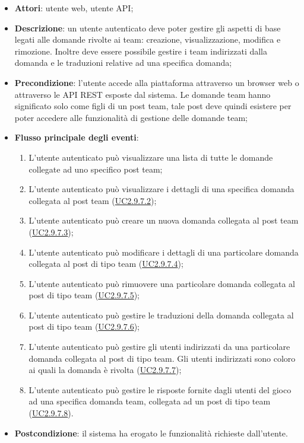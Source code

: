 \begin{itemize}
\item \textbf{Attori}: utente web, utente API;
\item \textbf{Descrizione}: un utente autenticato deve poter gestire gli aspetti di base legati alle domande rivolte ai team: creazione, visualizzazione, modifica e rimozione. Inoltre deve essere possibile gestire i team indirizzati dalla domanda e le traduzioni relative ad una specifica domanda; 
      \item \textbf{Precondizione}: l'utente accede alla piattaforma attraverso un browser web o attraverso le API REST esposte dal sistema. Le domande team hanno significato solo come figli di un post team, tale post deve quindi esistere per poter accedere alle funzionalità di gestione delle domande team;

        \item \textbf{Flusso principale degli eventi}:
          \begin{enumerate}
          \item L'utente autenticato può visualizzare una lista di tutte le domande collegate ad uno specifico post team;
          \item L'utente autenticato può visualizzare i dettagli di una specifica domanda collegata al post team (\hyperlink{UC2.9.7.2}{UC2.9.7.2});
          \item L'utente autenticato può creare un nuova domanda collegata al post team (\hyperlink{UC2.9.7.3}{UC2.9.7.3});
          \item L'utente autenticato può modificare i dettagli di una particolare domanda collegata al post di tipo team (\hyperlink{UC2.9.7.4}{UC2.9.7.4});
          \item L'utente autenticato può rimuovere una particolare domanda collegata al post di tipo team (\hyperlink{UC2.9.7.5}{UC2.9.7.5});
          \item L'utente autenticato può gestire le traduzioni della domanda collegata al post di tipo team (\hyperlink{UC2.9.7.6}{UC2.9.7.6});
          \item L'utente autenticato può gestire gli utenti indirizzati da una particolare domanda collegata al post di tipo team. Gli utenti indirizzati sono coloro ai quali la domanda è rivolta (\hyperlink{UC2.9.7.7}{UC2.9.7.7});
          \item L'utente autenticato può gestire le risposte fornite dagli utenti del gioco ad una specifica domanda team, collegata ad un post di tipo team (\hyperlink{UC2.9.7.8}{UC2.9.7.8}).

      \end{enumerate}
    \item \textbf{Postcondizione}: il sistema ha erogato le funzionalità richieste dall'utente.
  \end{itemize}

